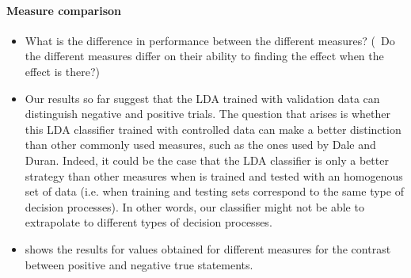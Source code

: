 \documentclass{article}
\begin{document}
\paragraph{Measure comparison}
\begin{itemize}

\item What is the difference in performance between the different measures? (~Do the different measures differ on their ability to finding the effect when the effect is there?)  

\item Our results so far suggest that the LDA trained with validation data can distinguish negative and positive trials. The question that arises is whether this LDA classifier trained with controlled data can make a better distinction than other commonly used measures, such as the ones used by Dale and Duran. Indeed, it could be the case that the LDA classifier is only a better strategy than other measures when is trained and tested with an homogenous set of data (i.e. when training and testing sets correspond to the same type of decision processes). In other words, our classifier might not be able to extrapolate to different types of decision processes. 

\item {} shows the results for values obtained for different measures for the contrast between positive and negative true statements. 


\end{itemize}
\end{document}
